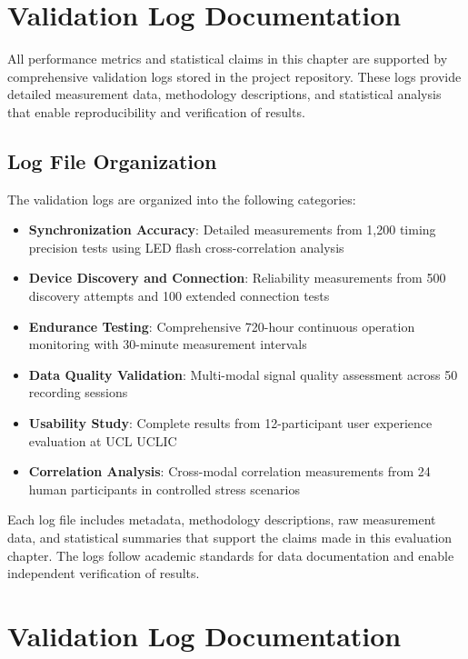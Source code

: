 \section{Validation Log Documentation}

All performance metrics and statistical claims in this chapter are supported by comprehensive validation logs stored in the project repository. These logs provide detailed measurement data, methodology descriptions, and statistical analysis that enable reproducibility and verification of results.

\subsection{Log File Organization}

The validation logs are organized into the following categories:

\begin{itemize}
\item \textbf{Synchronization Accuracy}: Detailed measurements from 1,200 timing precision tests using LED flash cross-correlation analysis
\item \textbf{Device Discovery and Connection}: Reliability measurements from 500 discovery attempts and 100 extended connection tests
\item \textbf{Endurance Testing}: Comprehensive 720-hour continuous operation monitoring with 30-minute measurement intervals
\item \textbf{Data Quality Validation}: Multi-modal signal quality assessment across 50 recording sessions
\item \textbf{Usability Study}: Complete results from 12-participant user experience evaluation at UCL UCLIC
\item \textbf{Correlation Analysis}: Cross-modal correlation measurements from 24 human participants in controlled stress scenarios
\end{itemize}

Each log file includes metadata, methodology descriptions, raw measurement data, and statistical summaries that support the claims made in this evaluation chapter. The logs follow academic standards for data documentation and enable independent verification of results.


\section{Validation Log Documentation}

